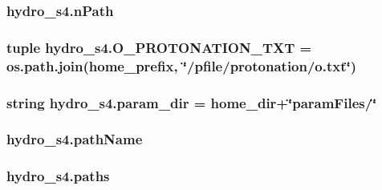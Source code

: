 \hypertarget{namespacehydro__s4_aead5430924dc67f871db1928cc25792e}{
\subsubsection[{n\-Path}]{\setlength{\rightskip}{0pt plus 5cm}hydro\-\_\-s4.\-n\-Path}}\label{namespacehydro__s4_aead5430924dc67f871db1928cc25792e}
\hypertarget{namespacehydro__s4_aa770e5ac528dc9451e7938c8c69d7988}{
\subsubsection[{O\-\_\-\-P\-R\-O\-T\-O\-N\-A\-T\-I\-O\-N\-\_\-\-T\-X\-T}]{\setlength{\rightskip}{0pt plus 5cm}tuple hydro\-\_\-s4.\-O\-\_\-\-P\-R\-O\-T\-O\-N\-A\-T\-I\-O\-N\-\_\-\-T\-X\-T = os.\-path.\-join({\bf home\-\_\-prefix}, \char`\"{}/pfile/protonation/o.\-txt\char`\"{})}}\label{namespacehydro__s4_aa770e5ac528dc9451e7938c8c69d7988}
\hypertarget{namespacehydro__s4_a1e650f939d99afbd6f274f51a29f61dd}{
\subsubsection[{param\-\_\-dir}]{\setlength{\rightskip}{0pt plus 5cm}string hydro\-\_\-s4.\-param\-\_\-dir = {\bf home\-\_\-dir}+\char`\"{}param\-Files/\char`\"{}}}\label{namespacehydro__s4_a1e650f939d99afbd6f274f51a29f61dd}
\hypertarget{namespacehydro__s4_ad115e94a3500ef38feb39fbbea0286f1}{
\subsubsection[{path\-Name}]{\setlength{\rightskip}{0pt plus 5cm}hydro\-\_\-s4.\-path\-Name}}\label{namespacehydro__s4_ad115e94a3500ef38feb39fbbea0286f1}
\hypertarget{namespacehydro__s4_a48c4d72063bdbc704b1e0aeef019ed96}{
\subsubsection[{paths}]{\setlength{\rightskip}{0pt plus 5cm}hydro\-\_\-s4.\-paths}}\label{namespacehydro__s4_a48c4d72063bdbc704b1e0aeef019ed96}
